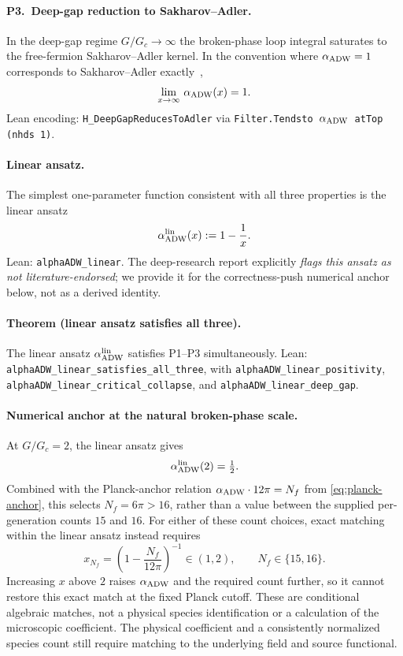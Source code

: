 \documentclass[aps,prd,twocolumn,showpacs,superscriptaddress,nofootinbib]{revtex4-2}
\newcommand{\Nf}{N_{f}}
\newcommand{\aADW}{\alpha_{\rm ADW}}
\newcommand{\Gc}{G_{c}}
\begin{document}
\paragraph*{P3.\ Deep-gap reduction to Sakharov--Adler.}
In the deep-gap regime $G/\Gc \to \infty$ the broken-phase loop
integral saturates to the free-fermion Sakharov--Adler kernel.
In the convention where $\aADW = 1$ corresponds to Sakharov--Adler
exactly~\cite{Adler1982,Visser2002},
\begin{equation}
\label{eq:P3-deepgap}
\lim_{x \to \infty}\,\aADW(x) = 1.
\end{equation}
Lean encoding: \texttt{H\_DeepGapReducesToAdler} via
\texttt{Filter.Tendsto $\aADW$ atTop (nhds 1)}.

\paragraph*{Linear ansatz.}
The simplest one-parameter function consistent with all three
properties is the linear ansatz
\begin{equation}
\label{eq:linear-ansatz}
\aADW^{\rm lin}(x) := 1 - \frac{1}{x}.
\end{equation}
Lean: \texttt{alphaADW\_linear}. The deep-research report explicitly
\emph{flags this ansatz as not literature-endorsed}; we provide it
for the correctness-push numerical anchor below, not as a derived
identity.

\paragraph*{Theorem (linear ansatz satisfies all three).}
The linear ansatz $\aADW^{\rm lin}$ satisfies P1--P3 simultaneously.
Lean: \texttt{alphaADW\_linear\_satisfies\_all\_three}, with
\texttt{alphaADW\_linear\_positivity},
\texttt{alphaADW\_linear\_critical\_collapse}, and
\texttt{alphaADW\_linear\_deep\_gap}.

\paragraph*{Numerical anchor at the natural broken-phase scale.}
At $G/\Gc = 2$, the linear ansatz gives
\begin{equation}
\label{eq:anchor-half}
\aADW^{\rm lin}(2) = \tfrac{1}{2}.
\end{equation}
Combined with the Planck-anchor relation
$\aADW \cdot 12\pi = \Nf$ from \eqref{eq:planck-anchor}, this
selects $\Nf=6\pi>16$, rather than a value between the supplied
per-generation counts $15$ and $16$. For either of these count choices,
exact matching within the linear ansatz instead requires
\begin{equation}
x_{\Nf} = \left(1-\frac{\Nf}{12\pi}\right)^{-1}\in(1,2),
\qquad \Nf\in\{15,16\}.
\end{equation}
Increasing $x$ above $2$ raises $\aADW$ and the required count further,
so it cannot restore this exact match at the fixed Planck cutoff.
These are conditional algebraic matches, not a physical species
identification or a calculation of the microscopic coefficient.
The physical coefficient and a consistently normalized species count
still require matching to the underlying field and source functional.
\end{document}
